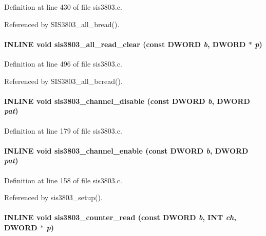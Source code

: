 Definition at line 430 of file sis3803.c.

Referenced by SIS3803\_\-all\_\-bread().
\paragraph[{sis3803\_\-all\_\-read\_\-clear}]{\setlength{\rightskip}{0pt plus 5cm}INLINE void sis3803\_\-all\_\-read\_\-clear (const {\bf DWORD} {\em b}, \/  {\bf DWORD} $\ast$ {\em p})}\hfill\label{sis3803_8h_aa474598dcce21082550c3a35bcab8084}


Definition at line 496 of file sis3803.c.

Referenced by SIS3803\_\-all\_\-bcread().
\paragraph[{sis3803\_\-channel\_\-disable}]{\setlength{\rightskip}{0pt plus 5cm}INLINE void sis3803\_\-channel\_\-disable (const {\bf DWORD} {\em b}, \/  {\bf DWORD} {\em pat})}\hfill\label{sis3803_8h_a2bca795b19bb555796c24f78056cd375}


Definition at line 179 of file sis3803.c.
\paragraph[{sis3803\_\-channel\_\-enable}]{\setlength{\rightskip}{0pt plus 5cm}INLINE void sis3803\_\-channel\_\-enable (const {\bf DWORD} {\em b}, \/  {\bf DWORD} {\em pat})}\hfill\label{sis3803_8h_ab2aec6402482aed426de23a94a4a180e}


Definition at line 158 of file sis3803.c.

Referenced by sis3803\_\-setup().
\paragraph[{sis3803\_\-counter\_\-read}]{\setlength{\rightskip}{0pt plus 5cm}INLINE void sis3803\_\-counter\_\-read (const {\bf DWORD} {\em b}, \/  {\bf INT} {\em ch}, \/  {\bf DWORD} $\ast$ {\em p})}\hfill\label{sis3803_8h_ad04ae7ba311a6cde6ac21ccc81a15f90}



